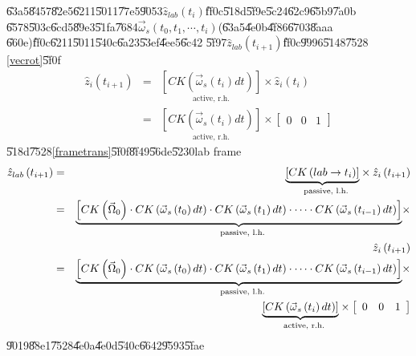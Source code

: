 \documentclass[12pt,a4paper]{article}
\begin{document}
\U{63a5}\U{8457}\U{82e5}\U{6211}\U{5011}\U{77e5}\U{9053}$\hat{z}_{lab}\left(
t_{i}\right) $\U{ff0c}\U{518d}\U{5f9e}\U{5c24}\U{62c9}\U{65b9}\U{7a0b}%
\U{6578}\U{503c}\U{6cd5}\U{89e3}\U{51fa}\U{7684}$\vec{\omega}_{s}\left(
t_{0},t_{1},\cdots ,t_{i}\right) $(\U{63a5}\U{4e0b}\U{4f86}\U{6703}\U{8aaa}%
\U{660e})\U{ff0c}\U{6211}\U{5011}\U{540c}\U{6a23}\U{53ef}\U{4ee5}\U{6c42}%
\U{5f97}$\hat{z}_{lab}\left( t_{i+1}\right) $\U{ff0c}\U{9996}\U{5148}\U{7528}%
\ref{vecrot}\U{5f0f}%
\begin{eqnarray*}
\hat{z}_{i}\left( t_{i+1}\right) &=&\underset{\text{active, r.h.}}{\left[
CK\left( \vec{\omega}_{s}\left( t_{i}\right) dt\right) \right] }\times \hat{z%
}_{i}\left( t_{i}\right) \\
&=&\underset{\text{active, r.h.}}{\left[ CK\left( \vec{\omega}_{s}\left(
t_{i}\right) dt\right) \right] }\times \left[ 
\begin{array}{ccc}
0 & 0 & 1%
\end{array}%
\right]
\end{eqnarray*}%
\U{518d}\U{7528}\ref{frametrans}\U{5f0f}\U{8f49}\U{56de}\U{5230}lab frame%
\begin{eqnarray}
\hat{z}_{lab}\left( t_{i+1}\right) &=&\underset{\text{passive, l.h.}}{%
\underbrace{\left[ CK\left( lab\rightarrow t_{i}\right) \right] }}\times 
\hat{z}_{i}\left( t_{i+1}\right)  \notag \\
&=&\underset{\text{passive, l.h.}}{\underbrace{\left[ CK\left( \vec{\Omega}%
_{0}\right) \cdot CK\left( \vec{\omega}_{s}\left( t_{0}\right) dt\right)
\cdot CK\left( \vec{\omega}_{s}\left( t_{1}\right) dt\right) \cdot \cdots
\cdot CK\left( \vec{\omega}_{s}\left( t_{i-1}\right) dt\right) \right] }}%
\times  \notag \\
&&\hat{z}_{i}\left( t_{i+1}\right)  \notag \\
&=&\underset{\text{passive, l.h.}}{\underbrace{\left[ CK\left( \vec{\Omega}%
_{0}\right) \cdot CK\left( \vec{\omega}_{s}\left( t_{0}\right) dt\right)
\cdot CK\left( \vec{\omega}_{s}\left( t_{1}\right) dt\right) \cdot \cdots
\cdot CK\left( \vec{\omega}_{s}\left( t_{i-1}\right) dt\right) \right] }}%
\times  \notag \\
&&\underset{\text{active, r.h.}}{\underbrace{\left[ CK\left( \vec{\omega}%
_{s}\left( t_{i}\right) dt\right) \right] }}\times \left[ 
\begin{array}{ccc}
0 & 0 & 1%
\end{array}%
\right]  \label{iterateeq0}
\end{eqnarray}%
\U{9019}\U{88e1}\U{7528}\U{4e0a}\U{4e0d}\U{540c}\U{6642}\U{9593}\U{5fae}%
\end{document}
